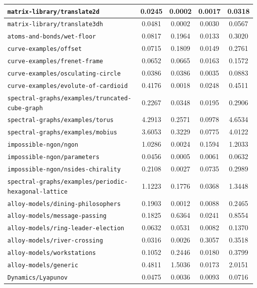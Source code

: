 \begin{longtable}{|p{6.5cm}|c|c|c|c|}
    \texttt{matrix-library/translate2d} & 0.0245 & 0.0002 & 0.0017 & 0.0318 \\ \hline
    \texttt{matrix-library/translate3dh} & 0.0481 & 0.0002 & 0.0030 & 0.0567 \\ \hline
    \texttt{atoms-and-bonds/wet-floor} & 0.0817 & 0.1964 & 0.0133 & 0.3020 \\ \hline
    \texttt{curve-examples/offset} & 0.0715 & 0.1809 & 0.0149 & 0.2761 \\ \hline
    \texttt{curve-examples/frenet-frame} & 0.0652 & 0.0665 & 0.0163 & 0.1572 \\ \hline
    \texttt{curve-examples/osculating-circle} & 0.0386 & 0.0386 & 0.0035 & 0.0883 \\ \hline
    \texttt{curve-examples/evolute-of-cardioid} & 0.4176 & 0.0018 & 0.0248 & 0.4511 \\ \hline
    \texttt{spectral-graphs/examples/truncated-cube-graph} & 0.2267 & 0.0348 & 0.0195 & 0.2906 \\ \hline
    \texttt{spectral-graphs/examples/torus} & 4.2913 & 0.2571 & 0.0978 & 4.6534 \\ \hline
    \texttt{spectral-graphs/examples/mobius} & 3.6053 & 0.3229 & 0.0775 & 4.0122 \\ \hline
    \texttt{impossible-ngon/ngon} & 1.0286 & 0.0024 & 0.1594 & 1.2033 \\ \hline
    \texttt{impossible-ngon/parameters} & 0.0456 & 0.0005 & 0.0061 & 0.0632 \\ \hline
    \texttt{impossible-ngon/nsides-chirality} & 0.2108 & 0.0027 & 0.0735 & 0.2989 \\ \hline
    \texttt{spectral-graphs/examples/periodic-hexagonal-lattice} & 1.1223 & 0.1776 & 0.0368 & 1.3448 \\ \hline
    \texttt{alloy-models/dining-philosophers} & 0.1903 & 0.0012 & 0.0088 & 0.2465 \\ \hline
    \texttt{alloy-models/message-passing} & 0.1825 & 0.6364 & 0.0241 & 0.8554 \\ \hline
    \texttt{alloy-models/ring-leader-election} & 0.0632 & 0.0531 & 0.0082 & 0.1370 \\ \hline
    \texttt{alloy-models/river-crossing} & 0.0316 & 0.0026 & 0.3057 & 0.3518 \\ \hline
    \texttt{alloy-models/workstations} & 0.1052 & 0.2446 & 0.0180 & 0.3799 \\ \hline
    \texttt{alloy-models/generic} & 0.4811 & 1.5036 & 0.0173 & 2.0151 \\ \hline
    \texttt{Dynamics/Lyapunov} & 0.0475 & 0.0036 & 0.0093 & 0.0716 \\ \hline

\end{longtable}
